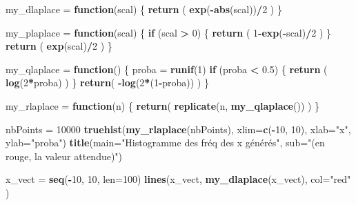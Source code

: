 \documentclass[]{article}
\newenvironment{Shaded}{\begin{snugshade}}{\end{snugshade}}
\newcommand{\ControlFlowTok}[1]{\textcolor[rgb]{0.13,0.29,0.53}{\textbf{#1}}}
\newcommand{\DataTypeTok}[1]{\textcolor[rgb]{0.13,0.29,0.53}{#1}}
\newcommand{\DecValTok}[1]{\textcolor[rgb]{0.00,0.00,0.81}{#1}}
\newcommand{\FloatTok}[1]{\textcolor[rgb]{0.00,0.00,0.81}{#1}}
\newcommand{\KeywordTok}[1]{\textcolor[rgb]{0.13,0.29,0.53}{\textbf{#1}}}
\newcommand{\NormalTok}[1]{#1}
\newcommand{\OperatorTok}[1]{\textcolor[rgb]{0.81,0.36,0.00}{\textbf{#1}}}
\newcommand{\StringTok}[1]{\textcolor[rgb]{0.31,0.60,0.02}{#1}}
\begin{document}
\begin{Shaded}
\begin{Highlighting}[]
\NormalTok{my_dlaplace =}\StringTok{ }\ControlFlowTok{function}\NormalTok{(scal) \{ }\KeywordTok{return}\NormalTok{ ( }\KeywordTok{exp}\NormalTok{(}\OperatorTok{-}\KeywordTok{abs}\NormalTok{(scal))}\OperatorTok{/}\DecValTok{2}\NormalTok{ ) \}}

\NormalTok{my_plaplace =}\StringTok{ }\ControlFlowTok{function}\NormalTok{(scal)}
\NormalTok{\{}
  \ControlFlowTok{if}\NormalTok{ (scal }\OperatorTok{>}\StringTok{ }\DecValTok{0}\NormalTok{) \{ }\KeywordTok{return}\NormalTok{ ( }\DecValTok{1}\OperatorTok{-}\KeywordTok{exp}\NormalTok{(}\OperatorTok{-}\NormalTok{scal)}\OperatorTok{/}\DecValTok{2}\NormalTok{ ) \}}
  \KeywordTok{return}\NormalTok{ ( }\KeywordTok{exp}\NormalTok{(scal)}\OperatorTok{/}\DecValTok{2}\NormalTok{ )}
\NormalTok{\}}

\NormalTok{my_qlaplace =}\StringTok{ }\ControlFlowTok{function}\NormalTok{()}
\NormalTok{\{}
\NormalTok{  proba =}\StringTok{ }\KeywordTok{runif}\NormalTok{(}\DecValTok{1}\NormalTok{)}
  \ControlFlowTok{if}\NormalTok{ (proba }\OperatorTok{<}\StringTok{ }\FloatTok{0.5}\NormalTok{) \{ }\KeywordTok{return}\NormalTok{ ( }\KeywordTok{log}\NormalTok{(}\DecValTok{2}\OperatorTok{*}\NormalTok{proba) ) \}}
  \KeywordTok{return}\NormalTok{( }\OperatorTok{-}\KeywordTok{log}\NormalTok{(}\DecValTok{2}\OperatorTok{*}\NormalTok{(}\DecValTok{1}\OperatorTok{-}\NormalTok{proba)) )}
\NormalTok{\}}

\NormalTok{my_rlaplace =}\StringTok{ }\ControlFlowTok{function}\NormalTok{(n)}
\NormalTok{\{}
  \KeywordTok{return}\NormalTok{( }\KeywordTok{replicate}\NormalTok{(n, }\KeywordTok{my_qlaplace}\NormalTok{()) )}
\NormalTok{\}}
\end{Highlighting}
\end{Shaded}

\begin{Shaded}
\begin{Highlighting}[]
\NormalTok{nbPoints =}\StringTok{ }\DecValTok{10000}
\KeywordTok{truehist}\NormalTok{(}\KeywordTok{my_rlaplace}\NormalTok{(nbPoints), }\DataTypeTok{xlim=}\KeywordTok{c}\NormalTok{(}\OperatorTok{-}\DecValTok{10}\NormalTok{, }\DecValTok{10}\NormalTok{), }\DataTypeTok{xlab=}\StringTok{"x"}\NormalTok{, }\DataTypeTok{ylab=}\StringTok{"proba"}\NormalTok{)}
\KeywordTok{title}\NormalTok{(}\DataTypeTok{main=}\StringTok{"Histogramme des fréq des x générés"}\NormalTok{,}
      \DataTypeTok{sub=}\StringTok{"(en rouge, la valeur attendue)"}\NormalTok{)}

\NormalTok{x_vect =}\StringTok{ }\KeywordTok{seq}\NormalTok{(}\OperatorTok{-}\DecValTok{10}\NormalTok{, }\DecValTok{10}\NormalTok{, }\DataTypeTok{len=}\DecValTok{100}\NormalTok{)}
\KeywordTok{lines}\NormalTok{(x_vect, }\KeywordTok{my_dlaplace}\NormalTok{(x_vect), }\DataTypeTok{col=}\StringTok{"red"}\NormalTok{ )}
\end{Highlighting}
\end{Shaded}
\end{document}

